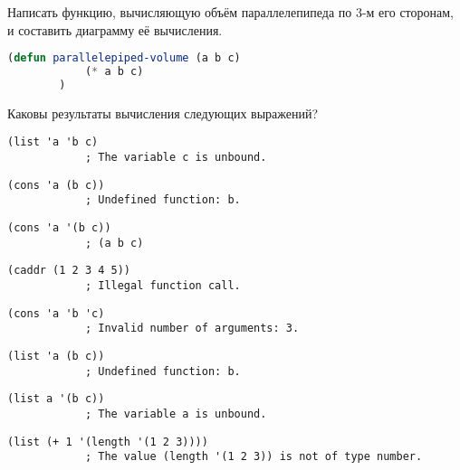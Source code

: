 \documentclass[a4paper,oneside,12pt]{extreport}
\begin{document}
\begin{task}
	Написать функцию, вычисляющую объём параллелепипеда по 3-м его сторонам, и составить диаграмму её вычисления.

	\begin{lstlisting}[language=Lisp, gobble=16]
		(defun parallelepiped-volume (a b c)
			(* a b c)
		)
	\end{lstlisting}
\end{task}

\begin{task}
	Каковы результаты вычисления следующих выражений?
	\begin{AutoMultiColEnumerate}
		\item \begin{lstlisting}[style=lispinline, gobble=24]
			(list 'a 'b c)
			; The variable c is unbound.
		\end{lstlisting}

		\item \begin{lstlisting}[style=lispinline, gobble=24]
			(cons 'a (b c))
			; Undefined function: b.
		\end{lstlisting}

		\item \begin{lstlisting}[style=lispinline, gobble=24]
			(cons 'a '(b c))
			; (a b c)
		\end{lstlisting}

		\item \begin{lstlisting}[style=lispinline, gobble=24]
			(caddr (1 2 3 4 5))
			; Illegal function call.
		\end{lstlisting}

		\item \begin{lstlisting}[style=lispinline, gobble=24]
			(cons 'a 'b 'c)
			; Invalid number of arguments: 3.
		\end{lstlisting}

		\item \begin{lstlisting}[style=lispinline, gobble=24]
			(list 'a (b c))
			; Undefined function: b.
		\end{lstlisting}

		\item \begin{lstlisting}[style=lispinline, gobble=24]
			(list a '(b c))
			; The variable a is unbound.
		\end{lstlisting}

		\item \begin{lstlisting}[style=lispinline, gobble=24]
			(list (+ 1 '(length '(1 2 3))))
			; The value (length '(1 2 3)) is not of type number.
		\end{lstlisting}
	\end{AutoMultiColEnumerate}
\end{task}
\end{document}
